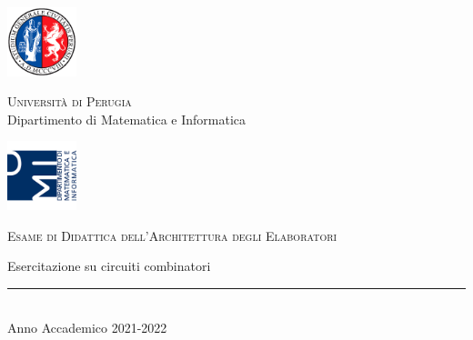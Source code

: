 
\thispagestyle{empty} %

	\noindent %
	\includegraphics[width=0.15\textwidth]{img/logoUniPg}
	\begin{minipage}[b]{0.7\textwidth}
		\centering
		{\Large {\textsc{Universit{\`a} di Perugia}}}\\
		\vspace{0.4 em}
		{\large {Dipartimento di Matematica e Informatica}}
		\vspace{0.6 em}
	\end{minipage}%
	\includegraphics[width=0.15\textwidth]{img/logoDMI}
	
	\vspace{5 em}

	\begin{center}
		
		{\large {\textsc{Esame di Didattica dell'Architettura degli Elaboratori}}}
		\vspace{8 em}
		
		{\Huge {Esercitazione su circuiti combinatori}}
		\vspace{10 em}
		
		
		\vspace{6 em}
		\vfill
		
	    {\rule{380pt}{.4pt}}\\
		\vspace{1.2 em}
		\large{{Anno Accademico 2021-2022}}
		
		
		
		
	\end{center}

